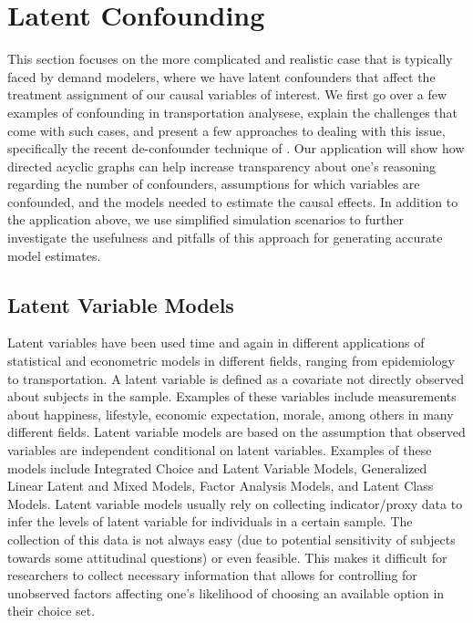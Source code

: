 \section{Latent Confounding}
\label{sec:latent-confounding}

This section focuses on the more complicated and realistic case that is 
typically faced by demand modelers, where we have latent confounders that 
affect the treatment assignment of our causal variables of interest. 
We first go over a few examples of confounding in transportation analysese, explain 
the challenges that come with such cases, and present a few approaches to 
dealing with this issue, specifically the recent de-confounder technique of 
\citet{wang_2019_blessings}. 
Our application will show how directed acyclic graphs can 
help increase transparency about one's reasoning regarding the number of 
confounders, assumptions for which variables are confounded, and the models 
needed to estimate the causal effects. 
In addition to the application above, we use simplified simulation scenarios to further investigate the usefulness 
and pitfalls of this approach for generating accurate model estimates. 

\subsection{Latent Variable Models}
Latent variables have been used time and again in different applications of statistical 
and econometric models in different fields, ranging from epidemiology to transportation.
A latent variable is defined as a covariate not directly observed about subjects in the sample.
Examples of these variables include measurements about happiness, lifestyle, economic expectation, 
morale, among others in many different fields.
Latent variable models are based on the assumption that observed variables are independent 
conditional on latent variables.
Examples of these models include Integrated Choice and Latent Variable Models, Generalized Linear Latent and Mixed Models, Factor Analysis Models, and Latent Class Models.
Latent variable models usually rely on collecting indicator/proxy data to infer the levels of latent variable for individuals in a certain sample.
The collection of this data is not always easy (due to potential sensitivity of subjects towards some attitudinal questions)
or even feasible. 
This makes it difficult for researchers to collect necessary information that allows
for controlling for unobserved factors affecting one's likelihood of choosing an available option in their choice set.


